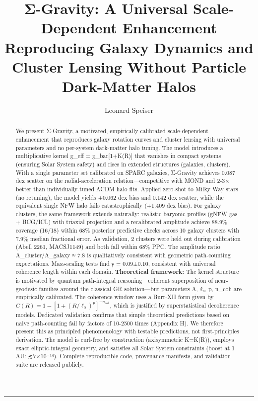 \documentclass[11pt,a4paper]{article}
\begin{document}
\title{Σ-Gravity: A Universal Scale-Dependent Enhancement Reproducing Galaxy Dynamics and Cluster Lensing Without Particle Dark-Matter Halos}

\author{Leonard Speiser}

\date{}

\maketitle

\medskip\hrule\medskip


\begin{abstract}
We present Σ-Gravity, a motivated, empirically calibrated scale-dependent enhancement that reproduces galaxy rotation curves and cluster lensing with universal parameters and no per-system dark-matter halo tuning. The model introduces a multiplicative kernel g\_eff = g\_bar[1+K(R)] that vanishes in compact systems (ensuring Solar System safety) and rises in extended structures (galaxies, clusters). With a single parameter set calibrated on SPARC galaxies, Σ-Gravity achieves 0.087 dex scatter on the radial-acceleration relation—competitive with MOND and 2-3× better than individually-tuned ΛCDM halo fits. Applied zero-shot to Milky Way stars (no retuning), the model yields +0.062 dex bias and 0.142 dex scatter, while the equivalent single NFW halo fails catastrophically (+1.409 dex bias). For galaxy clusters, the same framework extends naturally: realistic baryonic profiles (gNFW gas + BCG/ICL) with triaxial projection and a recalibrated amplitude achieve 88.9\% coverage (16/18) within 68\% posterior predictive checks across 10 galaxy clusters with 7.9\% median fractional error. As validation, 2 clusters were held out during calibration (Abell 2261, MACSJ1149) and both fall within 68\% PPC. The amplitude ratio A\_cluster/A\_galaxy ≈ 7.8 is qualitatively consistent with geometric path-counting expectations. Mass-scaling tests find γ = 0.09±0.10, consistent with universal coherence length within each domain. \textbf{Theoretical framework:} The kernel structure is motivated by quantum path-integral reasoning—coherent superposition of near-geodesic families around the classical GR solution—but parameters {A, ℓ₀, p, n\_coh} are empirically calibrated. The coherence window uses a Burr-XII form given by $\allowbreak C(R) = 1-[1+(R/\ell_0)^p]^{-n_{\mathrm{coh}}}$\allowbreak , which is justified by superstatistical decoherence models. Dedicated validation confirms that simple theoretical predictions based on naive path-counting fail by factors of 10-2500 times (Appendix H). We therefore present this as principled phenomenology with testable predictions, not first-principles derivation. The model is curl-free by construction (axisymmetric K=K(R)), employs exact elliptic-integral geometry, and satisfies all Solar System constraints (boost at 1 AU: ≲7×10⁻¹⁴). Complete reproducible code, provenance manifests, and validation suite are released publicly. 
\end{abstract}
\end{document}

